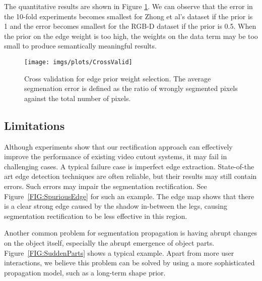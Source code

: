 \documentclass[10pt,journal,compsoc]{newIEEEtran}
\begin{document}
The quantitative results are shown in Figure \ref{FIG:CrossValid}. We can observe that the error in the 10-fold experiments becomes smallest for Zhong et al's dataset if the prior is 1 and the error becomes smallest for the RGB-D dataset if the prior is 0.5. When the prior on the edge weight is too high, the weights on the data term may be too small to produce semantically meaningful results.
\begin{figure}[!t]
 	\centering
 	\texttt{[image: imgs/plots/CrossValid]}
 	\caption{Cross validation for edge prior weight selection. The average segmenation error is defined as the ratio of wrongly segmented pixels against the total number of pixels.}\label{FIG:CrossValid}
 \end{figure}\subsection{Limitations}\label{sec:discussion}
Although experiments show that our rectification approach can effectively improve the performance of existing video cutout systems, it may fail in challenging cases. A typical failure case is imperfect edge extraction. State-of-the art edge detection techniques are often reliable, but their results may still contain errors. Such errors may impair the segmentation rectification. See Figure~\ref{FIG:SpuriousEdge} for such an example. The edge map shows that there is a clear strong edge caused by the shadow in-between the legs, causing segmentation rectification to be less effective in this region. %

Another common problem for segmentation propagation is having abrupt changes on the object itself, especially the abrupt emergence of object parts. Figure~\ref{FIG:SuddenParts} shows a typical example. Apart from more user interactions, we believe this problem can be solved by using a more sophisticated propagation model, such as a long-term shape prior.
\end{document}
